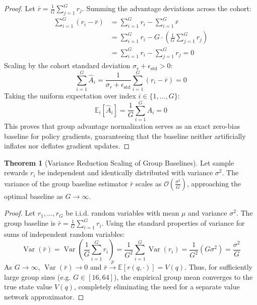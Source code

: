 \documentclass[11pt,a4paper]{article}
\theoremstyle{definition}
\newtheorem{theorem}{\textbf{Theorem}}[section]
\begin{document}
\begin{proof}
Let $\bar{r} = \frac{1}{G}\sum_{j=1}^G r_j$.
Summing the advantage deviations across the cohort:
{\boldmath
\begin{align}
\sum_{i=1}^G (r_i - \bar{r}) &= \sum_{i=1}^G r_i - \sum_{i=1}^G \bar{r} \\
&= \sum_{i=1}^G r_i - G \cdot \left( \frac{1}{G}\sum_{j=1}^G r_j \right) \\
&= \sum_{i=1}^G r_i - \sum_{j=1}^G r_j = 0
\end{align}
}
Scaling by the cohort standard deviation $\sigma_r + \epsilon_{\text{std}} > 0$:
{\boldmath
\begin{equation}
\sum_{i=1}^G \hat{A}_i = \frac{1}{\sigma_r + \epsilon_{\text{std}}} \sum_{i=1}^G (r_i - \bar{r}) = 0
\end{equation}
}
Taking the uniform expectation over index $i \in \{1, \dots, G\}$:
{\boldmath
\begin{equation}
\mathbb{E}_i[\hat{A}_i] = \frac{1}{G}\sum_{i=1}^G \hat{A}_i = 0
\end{equation}
}
This proves that group advantage normalization serves as an exact zero-bias baseline for policy gradients, guaranteeing that the baseline neither artificially inflates nor deflates gradient updates.
\end{proof}

\begin{theorem}[Variance Reduction Scaling of Group Baselines]
Let sample rewards $r_i$ be independent and identically distributed with variance $\sigma^2$. The variance of the group baseline estimator $\bar{r}$ scales as $\mathcal{O}\left(\frac{\sigma^2}{G}\right)$, approaching the optimal baseline as $G \to \infty$.
\end{theorem}

\begin{proof}
Let $r_1, \dots, r_G$ be i.i.d. random variables with mean $\mu$ and variance $\sigma^2$.
The group baseline is $\bar{r} = \frac{1}{G}\sum_{i=1}^G r_i$.
Using the standard properties of variance for sums of independent random variables:
{\boldmath
\begin{equation}
\operatorname{Var}(\bar{r}) = \operatorname{Var}\left( \frac{1}{G}\sum_{i=1}^G r_i \right) = \frac{1}{G^2} \sum_{i=1}^G \operatorname{Var}(r_i) = \frac{1}{G^2} (G \sigma^2) = \frac{\sigma^2}{G}
\end{equation}
}
As $G \to \infty$, $\operatorname{Var}(\bar{r}) \to 0$ and $\bar{r} \xrightarrow{p} \mathbb{E}[r(q, \cdot)] = V(q)$.
Thus, for sufficiently large group sizes (e.g. $G \in [16, 64]$), the empirical group mean converges to the true state value $V(q)$, completely eliminating the need for a separate value network approximator.
\end{proof}
\end{document}
